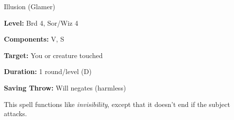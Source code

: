 \label{spell:Greater Invisibility}

Illusion (Glamer)

\textbf{Level:} Brd 4, Sor/Wiz 4

\textbf{Components:} V, S

\textbf{Target:} You or creature touched

\textbf{Duration:} 1 round/level (D)

\textbf{Saving Throw:} Will negates (harmless)

This spell functions like \textit{invisibility}, except that it doesn't end if 
the subject attacks.

